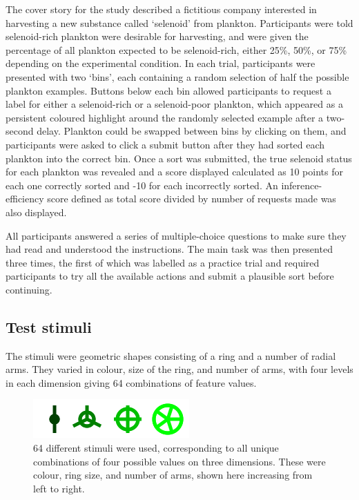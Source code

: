 \documentclass[10pt,letterpaper]{article}
\begin{document}
The cover story for the study described a fictitious company interested in harvesting a new substance called `selenoid' from plankton. Participants were told selenoid-rich plankton were desirable for harvesting, and were given the percentage of all plankton expected to be selenoid-rich, either 25\%, 50\%, or 75\% depending on the experimental condition. In each trial, participants were presented with two `bins', each containing a random selection of half the possible plankton examples. Buttons below each bin allowed participants to request a label for either a selenoid-rich or a selenoid-poor plankton, which appeared as a persistent coloured highlight around the randomly selected example after a two-second delay. Plankton could be swapped between bins by clicking on them, and participants were asked to click a \textsf{submit} button after they had sorted each plankton into the correct bin. Once a sort was submitted, the true selenoid status for each plankton was revealed and a score displayed calculated as 10 points for each one correctly sorted and -10 for each incorrectly sorted. An inference-efficiency score defined as total score divided by number of requests made was also displayed. 

All participants answered a series of multiple-choice questions to make sure they had read and understood the instructions. The main task was then presented three times, the first of which was labelled as a practice trial and required participants to try all the available actions and submit a plausible sort before continuing. 


\subsection{Test stimuli}
The stimuli were geometric shapes consisting of a ring and a number of radial arms. They varied in colour, size of the ring, and number of arms, with four levels in each dimension giving 64 combinations of feature values.

\begin{figure}[htb]
\includegraphics[width=.3\textwidth]{minstim.png}
\caption{64 different stimuli were used, corresponding to all unique combinations of four possible values on three dimensions. These were colour, ring size, and number of arms, shown here increasing from left to right.}
\end{figure}
\end{document}
